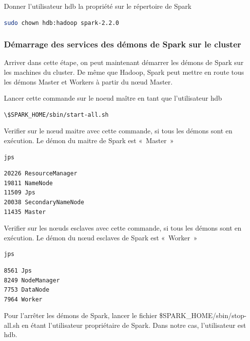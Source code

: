 \documentclass[12pt,french]{book}
\begin{document}
Donner l’utilisateur hdb la propriété sur le répertoire de Spark

\begin{lstlisting}[language=bash, frame=single]
sudo chown hdb:hadoop spark-2.2.0
\end{lstlisting}

\subsubsection{Démarrage des services des démons de Spark sur le cluster}

Arriver dans cette étape, on peut maintenant démarrer les démons de Spark sur les machines du cluster. De même que Hadoop, Spark peut mettre en route tous les démons Master et Workers à partir du nœud Master.

Lancer cette commande sur le noeud maître en tant que l’utilisateur hdb
\begin{lstlisting}[language=bash, frame=single]
\$SPARK_HOME/sbin/start-all.sh 
\end{lstlisting}

Verifier sur le nœud maitre avec cette commande, si tous les démons sont en exécution. Le démon du maitre de Spark est « Master »

\begin{lstlisting}[language=bash, frame=single]
jps
\end{lstlisting}

\begin{lstlisting}[language=bash, frame=single]
20226 ResourceManager
19811 NameNode
11509 Jps
20038 SecondaryNameNode
11435 Master
\end{lstlisting}

Verifier sur les nœuds esclaves avec cette commande, si tous les démons sont en exécution. Le démon du nœud esclaves de Spark est « Worker »

\begin{lstlisting}[language=bash, frame=single]
jps
\end{lstlisting}

\begin{lstlisting}[language=bash, frame=single]
8561 Jps
8249 NodeManager
7753 DataNode
7964 Worker
\end{lstlisting}

Pour l’arrêter les démons de Spark, lancer le fichier \$SPARK\_HOME/sbin/stop-all.sh en étant l’utilisateur propriétaire de Spark.
Dans notre cas, l’utilisateur est hdb. 
\end{document}

